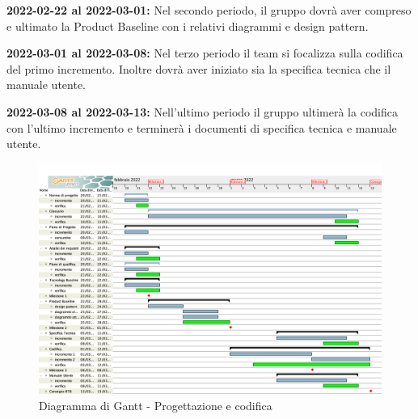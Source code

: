 \textbf{2022-02-22 al 2022-03-01:} Nel secondo periodo,  il gruppo dovrà aver compreso e ultimato la Product Baseline con i relativi diagrammi e design pattern.

\textbf{2022-03-01 al 2022-03-08:} Nel terzo periodo il team si focalizza sulla codifica del primo incremento.  Inoltre dovrà aver iniziato sia la specifica tecnica che il manuale utente.

\textbf{2022-03-08 al 2022-03-13:} Nell'ultimo periodo il gruppo ultimerà la codifica con l’ultimo incremento e terminerà i documenti di specifica tecnica e manuale utente.

\begin{figure}[H]
\centering
\includegraphics[scale=0.35]{Sezioni/gantt/progettazione_codifica.png}
\caption{Diagramma di Gantt - Progettazione e codifica}
\end{figure}